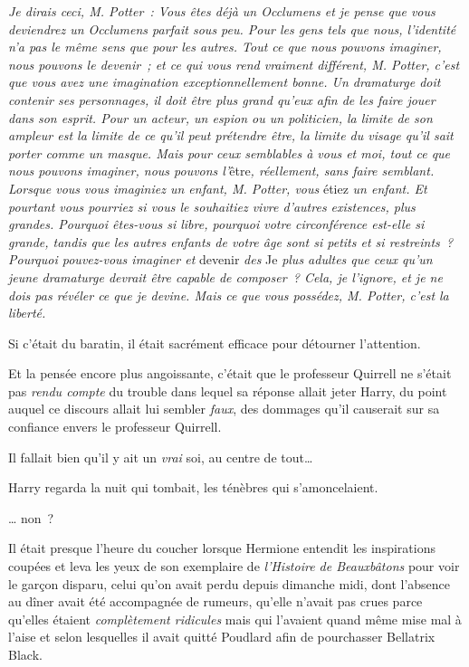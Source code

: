 \emph{Je dirais ceci, M. Potter~: Vous êtes déjà un Occlumens et je pense que vous deviendrez un Occlumens parfait sous peu. Pour les gens tels que nous, l'identité n'a pas le même sens que pour les autres. Tout ce que nous pouvons imaginer, nous pouvons le devenir~; et ce qui vous rend vraiment différent, M. Potter, c'est que vous avez une imagination exceptionnellement bonne. Un dramaturge doit contenir ses personnages, il doit être plus grand qu'eux afin de les faire jouer dans son esprit. Pour un acteur, un espion ou un politicien, la limite de son ampleur est la limite de ce qu'il peut prétendre être, la limite du visage qu'il sait porter comme un masque. Mais pour ceux semblables à vous et moi, tout ce que nous pouvons imaginer, nous pouvons l'}être\emph{, réellement, sans faire semblant. Lorsque vous vous imaginiez un enfant, M. Potter, vous} étiez \emph{un enfant. Et pourtant vous pourriez si vous le souhaitiez vivre d'autres existences, plus grandes. Pourquoi êtes-vous si libre, pourquoi votre circonférence est-elle si grande, tandis que les autres enfants de votre âge sont si petits et si restreints~? Pourquoi pouvez-vous imaginer et} devenir \emph{des} Je \emph{plus adultes que ceux qu'un jeune dramaturge devrait être capable de composer~? Cela, je l'ignore, et je ne dois pas révéler ce que je devine. Mais ce que vous possédez, M. Potter, c'est la liberté.}

Si c'était du baratin, il était sacrément efficace pour détourner l'attention.

Et la pensée encore plus angoissante, c'était que le professeur Quirrell ne s'était pas \emph{rendu compte} du trouble dans lequel sa réponse allait jeter Harry, du point auquel ce discours allait lui sembler \emph{faux}, des dommages qu'il causerait sur sa confiance envers le professeur Quirrell.

Il fallait bien qu'il y ait un \emph{vrai} soi, au centre de tout…

Harry regarda la nuit qui tombait, les ténèbres qui s'amoncelaient.

… non~?

\later

Il était presque l'heure du coucher lorsque Hermione entendit les inspirations coupées et leva les yeux de son exemplaire de \emph{l'Histoire de Beauxbâtons} pour voir le garçon disparu, celui qu'on avait perdu depuis dimanche midi, dont l'absence au dîner avait été accompagnée de rumeurs, qu'elle n'avait pas crues parce qu'elles étaient \emph{complètement ridicules} mais qui l'avaient quand même mise mal à l'aise et selon lesquelles il avait quitté Poudlard afin de pourchasser Bellatrix Black.

